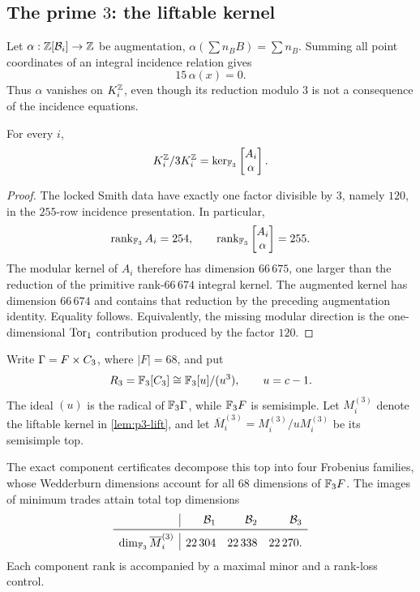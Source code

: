 \subsection{The prime \(3\): the liftable kernel}

Let \(\alpha:\mathbb Z[\mathcal B_i]\to\mathbb Z\) be augmentation,
\(\alpha(\sum n_BB)=\sum n_B\).  Summing all point coordinates of an
integral incidence relation gives
\[
 15\,\alpha(x)=0.
\]
Thus \(\alpha\) vanishes on \(K_i^{\mathbb Z}\), even though its reduction
modulo \(3\) is not a consequence of the incidence equations.

\begin{lemma}
\label{lem:p3-lift}
For every \(i\),
\[
 K_i^{\mathbb Z}/3K_i^{\mathbb Z}
 =
 \ker_{\mathbb F_3}
 \begin{bmatrix}A_i\\ \alpha\end{bmatrix}.
\]
\end{lemma}

\begin{proof}
The locked Smith data have exactly one factor divisible by \(3\), namely
\(120\), in the \(255\)-row incidence presentation.  In particular,
\[
 \operatorname{rank}_{\mathbb F_3}A_i=254,\qquad
 \operatorname{rank}_{\mathbb F_3}\begin{bmatrix}A_i\\ \alpha\end{bmatrix}=255.
\]
The modular kernel of \(A_i\) therefore has dimension \(66\,675\), one
larger than the reduction of the primitive rank-\(66\,674\) integral
kernel.  The augmented kernel has dimension \(66\,674\) and contains that
reduction by the preceding augmentation identity.  Equality follows.
Equivalently, the missing modular direction is the one-dimensional
\(\operatorname{Tor}_1\) contribution produced by the factor \(120\).
\end{proof}

Write \(\Gamma=F\times C_3\), where \(|F|=68\), and put
\[
 R_3=\mathbb F_3[C_3]\cong\mathbb F_3[u]/(u^3),
 \qquad u=c-1.
\]
The ideal \((u)\) is the radical of \(\mathbb F_3\Gamma\), while
\(\mathbb F_3F\) is semisimple.  Let \(M_i^{(3)}\) denote the liftable kernel in
\cref{lem:p3-lift}, and let \(\overline M_i^{(3)}=M_i^{(3)}/uM_i^{(3)}\)
be its semisimple top.

The exact component certificates decompose this top into four Frobenius
families, whose Wedderburn dimensions account for all \(68\) dimensions
of \(\mathbb F_3F\).  The images of minimum trades attain total top dimensions
\[
\begin{array}{c|rrr}
 &\cB_1&\cB_2&\cB_3\\
\midrule
\dim_{\FF_3}\overline M_i^{(3)}
 &22\,304&22\,338&22\,270.
\end{array}
\]
Each component rank is accompanied by a maximal minor and a rank-loss
control.

